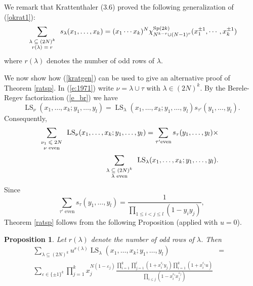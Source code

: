 \documentclass[11pt]{amsart}
\newcommand{\tmop}[1]{\ensuremath{\operatorname{#1}}}
\newtheorem{proposition}{Proposition}
\newcommand{\tmscript}[1]{\text{\scriptsize $#1$}}
\begin{document}
We remark that Krattenthaler {\cite{krat}} (3.6) proved the
following generalization of (\ref{okrat1}):
\begin{equation}
  \label{kratgen} \sum_{\tmscript{\begin{array}{c}
    \lambda \subseteq ( 2 N )^k\\
    r ( \lambda ) = r
  \end{array}}} s_{\lambda} ( x_1, \ldots, x_k ) = ( x_1 \cdots x_k )^N
  \chi_{N^{k - r} \cup ( N - 1 )^r}^{\tmop{Sp}(2 k)} ( x_1^{\pm 1}, \cdots,
  x_k^{\pm 1} )
\end{equation}
where $r ( \lambda )$ denotes the number of odd rows of $\lambda$.

We now show how (\ref{kratgen}) can be used to give an alternative
proof of Theorem \ref{ratsp}. In (\ref{e:1971}) write $\nu =
\lambda \cup \tau$ with $\lambda \in ( 2 N )^k$. By the
Berele-Regev factorization (\ref{e_br}) we have
\[ \tmop{LS}_{\nu} ( x_1, \ldots, x_k ; y_1, \ldots, y_l ) =
   \tmop{LS}_{\lambda} ( x_1, \ldots, x_k ; y_1, \ldots, y_l ) s_{\tau'} (
   y_1, \ldots, y_l ) . \]
Consequently,
\begin{eqnarray*}
  \sum_{\tmscript{\begin{array}{c}
    \nu_1 \leqslant 2 N\\
    \text{$\nu$ even}
  \end{array}}} \tmop{LS}_{\nu} ( x_1, \ldots, x_k ; y_1, \ldots, y_l ) =
  \sum_{\tau' \text{even}} s_{\tau} ( y_1, \ldots, y_l ) \times &  & \\
  \sum_{\tmscript{\begin{array}{c}
    \lambda \subseteq ( 2 N )^k\\
    \text{$\lambda$ even}
  \end{array}}} \tmop{LS}_{\lambda} ( x_1, \ldots, x_k ; y_1, \ldots, y_l ) .
  &  &
\end{eqnarray*}
Since
\begin{equation}
  \sum_{\text{$\tau'$ even}} s_{\tau} ( y_1, \ldots, y_l ) = \frac{1}{\prod_{1
  \leqslant i < j \leqslant l} ( 1 - y_i y_j )},
\end{equation}
Theorem \ref{ratsp} follows from the following Proposition
(applied with $u = 0$).

\begin{proposition}
  \label{prop:sp3}Let $r ( \lambda )$ denote the number of odd rows of
  $\lambda$. Then
  \begin{eqnarray*}
    \sum_{\lambda \subseteq ( 2 N )^k} u^{r ( \lambda )} \tmop{LS}_{\lambda} (
    x_1, \ldots, x_k ; y_1, \ldots, y_l ) & = & \\
    \sum_{\varepsilon \in \{ \pm 1 \}^k} \prod_{j = 1}^k x_j^{N ( 1 -
    \varepsilon_j )} \frac{\prod_{i = 1}^k \prod_{j = 1}^l ( 1 +
    x_i^{\varepsilon_i} y_j ) \prod_{i = 1}^k ( 1 + x_i^{\varepsilon_i} u
    )}{\prod_{i \leqslant j} ( 1 - x_i^{\varepsilon_i} x_j^{\varepsilon_j} )}
    &  &
  \end{eqnarray*}
\end{proposition}
\end{document}
